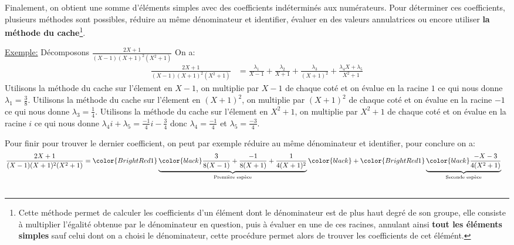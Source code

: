 Finalement, on obtient une somme d'éléments simples avec des coefficients indéterminés aux numérateurs. Pour déterminer ces coefficients, plusieurs méthodes sont possibles, réduire au même dénominateur et identifier, évaluer en des valeurs annulatrices ou encore utiliser \textbf{la méthode du cache}\footnote[2]{Cette méthode permet de calculer les coefficients d'un élément dont le dénominateur est de plus haut degré de son groupe, elle consiste à multiplier l'égalité obtenue par le dénominateur en question, puis à évaluer en une de ces racines, annulant ainsi \textbf{tout les éléments simples} sauf celui dont on a choisi le dénominateur, cette procédure permet alors de trouver les coefficients de cet élémént.}.\< 

\underline{Exemple:} Décomposons \(\frac{2X+1}{(X-1)(X+1)^2(X^2+1)}\)\+
On a:
   \begin{align*}
      \frac{2X+1}{(X-1)(X+1)^2(X^2+1)} &= \frac{\lambda_1}{X-1} + \frac{\lambda_2}{X+1}+ \frac{\lambda_3}{(X+1)^2} + \frac{\lambda_4X+ \lambda_5}{X^2+1}
   \end{align*}
Utilisons la méthode du cache sur l'élement en \(X-1\), on multiplie par \(X-1\) de chaque coté et on évalue en la racine \(1\) ce qui nous donne \(\lambda_1 = \frac{3}{8}\).\+
Utilisons la méthode du cache sur l'élement en \((X+1)^2\), on multiplie par \((X+1)^2\) de chaque coté et on évalue en la racine \(-1\) ce qui nous donne \(\lambda_3 = \frac{1}{4}\).\+
Utilisons la méthode du cache sur l'élement en \(X^2+1\), on multiplie par \(X^2+1\) de chaque coté et on évalue en la racine \(i\) ce qui nous donne \(\lambda_4i+\lambda_5 = \frac{-1}{4}i - \frac{3}{4}\) donc \(\lambda_4=\frac{-1}{4}\) et \(\lambda_5=\frac{-3}{4}\).\<

Pour finir pour trouver le dernier coefficient, on peut par exemple réduire au même dénominateur et identifier, pour conclure on a:
\begin{align*}
   \frac{2X+1}{(X-1)(X+1)^2(X^2+1)} &= \color{BrightRed1}\underbrace{\color{black}\frac{3}{8(X-1)} + \frac{-1}{8(X+1)}+ \frac{1}{4(X+1)^2}}_\text{Première espèce} \color{black}+\color{BrightRed1}\underbrace{\color{black} \frac{-X - 3}{4(X^2+1)}}_\text{Seconde espèce} 
\end{align*}
\subsection*{}

